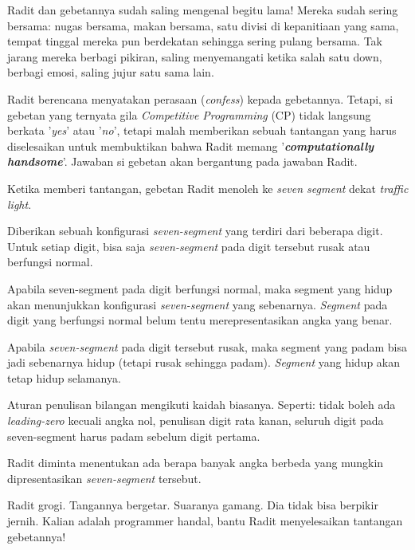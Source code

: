 \documentclass{article}
\begin{document}
\par\noindent Radit dan gebetannya sudah saling mengenal begitu lama! Mereka sudah sering bersama: nugas bersama, makan bersama, satu divisi di kepanitiaan yang sama, tempat tinggal mereka pun berdekatan sehingga sering pulang bersama. Tak jarang mereka berbagi pikiran, saling menyemangati ketika salah satu down, berbagi emosi, saling jujur satu sama lain.
\newline
\par\noindent Radit berencana menyatakan perasaan (\textit{confess}) kepada gebetannya. Tetapi, si gebetan yang ternyata gila \textit{Competitive Programming} (CP) tidak langsung berkata '\textit{yes}' atau '\textit{no}', tetapi malah memberikan sebuah tantangan yang harus diselesaikan untuk membuktikan bahwa Radit memang '\textit{\textbf{computationally handsome}}'. Jawaban si gebetan akan bergantung pada jawaban Radit.
\newline
\par\noindent Ketika memberi tantangan, gebetan Radit menoleh ke \textit{seven segment} dekat \textit{traffic light}.
\newline
\par\noindent Diberikan sebuah konfigurasi \textit{seven-segment} yang terdiri dari beberapa digit. Untuk setiap digit, bisa saja \textit{seven-segment} pada digit tersebut rusak atau berfungsi normal.
\newline
\par\noindent Apabila seven-segment pada digit berfungsi normal, maka segment yang hidup akan menunjukkan konfigurasi \textit{seven-segment} yang sebenarnya. \textit{Segment} pada digit yang berfungsi normal belum tentu merepresentasikan angka yang benar.
\newline
\par\noindent Apabila \textit{seven-segment} pada digit tersebut rusak, maka segment yang padam bisa jadi sebenarnya hidup (tetapi rusak sehingga padam). \textit{Segment} yang hidup akan tetap hidup selamanya.
\newline
\par\noindent Aturan penulisan bilangan mengikuti kaidah biasanya. Seperti: tidak boleh ada \textit{leading-zero} kecuali angka nol, penulisan digit rata kanan, seluruh digit pada seven-segment harus padam sebelum digit pertama. 
\newline
\par\noindent Radit diminta menentukan ada berapa banyak angka berbeda yang mungkin dipresentasikan \textit{seven-segment} tersebut.
\newline
\par\noindent Radit grogi. Tangannya bergetar. Suaranya gamang. Dia tidak bisa berpikir jernih. Kalian adalah programmer handal, bantu Radit menyelesaikan tantangan gebetannya!
\end{document}
